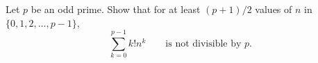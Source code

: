 Let $p$ be an odd prime. Show that for at least $(p+1)/2$ values of $n$ in $\{0,1,2,\dots,p-1\}$,
\[
\sum_{k=0}^{p-1} k! n^k \qquad \mbox{is not divisible by $p$.}
\]
